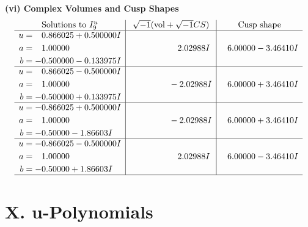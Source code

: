 \documentclass[1p]{elsarticle_modified}
\theoremstyle{definition}
\newcommand{\I}{\sqrt{-1}}
\begin{document}
\newpage\flushleft \textbf{(vi) Complex Volumes and Cusp Shapes}
$$\begin{array}{c|c|c}  
\text{Solutions to }I^u_{9}& \I (\text{vol} + \sqrt{-1}CS) & \text{Cusp shape}\\
 \hline 
\begin{aligned}
u &= \phantom{-}0.866025 + 0.500000 I \\
a &= \phantom{-}1.00000\phantom{ +0.000000I} \\
b &= -0.500000 - 0.133975 I\end{aligned}
 & \phantom{-0.000000 -}2.02988 I & \phantom{-}6.00000 - 3.46410 I \\ \hline\begin{aligned}
u &= \phantom{-}0.866025 - 0.500000 I \\
a &= \phantom{-}1.00000\phantom{ +0.000000I} \\
b &= -0.500000 + 0.133975 I\end{aligned}
 & \phantom{-0.000000 } -2.02988 I & \phantom{-}6.00000 + 3.46410 I \\ \hline\begin{aligned}
u &= -0.866025 + 0.500000 I \\
a &= \phantom{-}1.00000\phantom{ +0.000000I} \\
b &= -0.50000 - 1.86603 I\end{aligned}
 & \phantom{-0.000000 } -2.02988 I & \phantom{-}6.00000 + 3.46410 I \\ \hline\begin{aligned}
u &= -0.866025 - 0.500000 I \\
a &= \phantom{-}1.00000\phantom{ +0.000000I} \\
b &= -0.50000 + 1.86603 I\end{aligned}
 & \phantom{-0.000000 -}2.02988 I & \phantom{-}6.00000 - 3.46410 I\\
 \hline 
 \end{array}$$\newpage
\newpage\renewcommand{\arraystretch}{1}
\centering \section*{ X. u-Polynomials}
\end{document}
